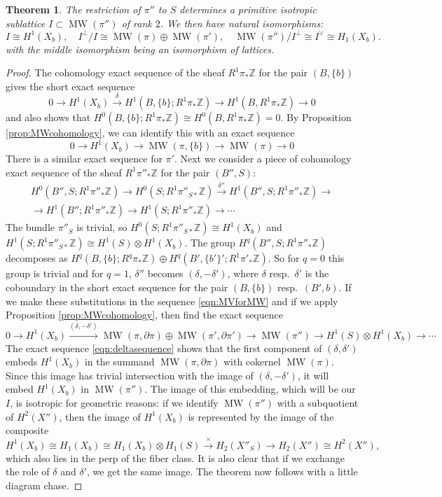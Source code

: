 \documentclass[10pt,letterpaper]{amsart}
\numberwithin{equation}{section}
\def\ZZ{{\mathbb Z}}
\newcommand{\p}{\partial}
\newcommand\MW{\operatorname{MW}}
\newtheorem{theorem}{Theorem}[section]
\theoremstyle{remark}
\begin{document}
\begin{theorem}\label{thm:fiberconnectedsum}
The  restriction of $\pi''$ to $S$  determines a  primitive  isotropic sublattice $I\subset \MW(\pi'')$ of rank $2$. We then have natural isomorphisms:
\[
I\cong H^1(X_b), \quad I^\perp/I\cong \MW(\pi)\oplus \MW(\pi'), \quad  \MW(\pi'')/I^\perp\cong I^\vee\cong H_1(X_b).
\]
with the middle isomorphism being an isomorphism of lattices.
\end{theorem}
\begin{proof}
The cohomology exact sequence of the sheaf $R^1\pi_*\ZZ$ for the pair $(B,\{b\})$ gives the short exact sequence
\[
0\to H^1(X_b)\xrightarrow{\delta}  H^1(B, \{b\}; R^1\pi_*\ZZ)\to H^1(B, R^1\pi_*\ZZ)\to 0 
\]
and also shows that $H^0(B, \{b\}; R^1\pi_*\ZZ)\cong H^0(B, R^1\pi_*\ZZ)=0$.  By Proposition \ref{prop:MWcohomology}, we can identify this with an exact sequence
\begin{equation}\label{eqn:deltasequence}
0\to H^1(X_b)\to  \MW (\pi, \{b\})\to \MW(\pi)\to 0 
\end{equation}
There is a similar exact sequence for $\pi'$. 
Next we consider a piece of  cohomology exact sequence of the sheaf $R^1\pi''_*\ZZ$ for the  pair $(B'', S)$:
\begin{multline}\label{eqn:MVforMW}
H^0(B'',S; R^1\pi''_*\ZZ)\to H^{0}(S; R^1\pi''_{S*}\ZZ)\xrightarrow{\delta''} H^1(B'',S; R^1\pi''_*\ZZ)\to\\
\to H^1(B''; R^1\pi''_*\ZZ)\to  H^1(S; R^1\pi''_*\ZZ)\to\cdots
\end{multline}
The bundle $\pi''_S$ is trivial, so $H^{0}(S; R^1\pi''_{S*}\ZZ)\cong H^1(X_b)$ and $H^1(S; R^1\pi''_{S*}\ZZ)\cong H^1(S)\otimes H^1(X_b)$. 
The group $H^q(B'',S; R^1\pi''_*\ZZ)$ decomposes as $H^q(B,\{b\}; R^q\pi_*\ZZ)\oplus 
H^q(B',\{b'\}'; R^1\pi'_*\ZZ)$.  So for $q=0$ this group is trivial  and for $q=1$,   $\delta''$ becomes  $(\delta, -\delta')$, where $\delta$ resp.\ $\delta'$ is  the coboundary 
in the short exact sequence for the pair $(B,\{b\})$ resp.\  $(B',b)$.   If we make these substitutions  in the sequence \eqref{eqn:MVforMW} and if we apply Proposition \ref{prop:MWcohomology}, then find the exact sequence
\[
0\to H^1(X_b)\xrightarrow{(\delta, -\delta')} \MW(\pi, \p\pi)\oplus \MW(\pi', \p\pi')\to \MW(\pi'') \to H^1(S)\otimes H^1(X_b)\to\cdots  
\]
The exact sequence \eqref{eqn:deltasequence} shows  that the   first  component of $(\delta, \delta')$ embeds  
$H^1(X_b)$ in  the summand $\MW(\pi, \p\pi)$ with cokernel  $\MW(\pi)$.
Since this image has trivial intersection with the image of  $(\delta, -\delta')$, it will embed $H^1(X_b)$ in $\MW(\pi'')$. The image of this embedding, which  will  be our  $I$,   
is isotropic for geometric reasons: if we identify  $\MW(\pi'')$ with a subquotient of $H^2(X'')$, then the image of $H^1(X_b)$ is represented by the image of the composite 
\[H^1(X_b)\cong H_1(X_b)\cong H_1(X_b)\otimes H_1(S)\xrightarrow{\times} H_2(X''_S)\to H_2(X'')\cong H^2(X''),\]
which also lies in the perp of the fiber class.  It is also clear that if we exchange the role of $\delta$ and $\delta'$, we get the same image.
The theorem now follows with a little diagram chase.
\end{proof}
\end{document}
